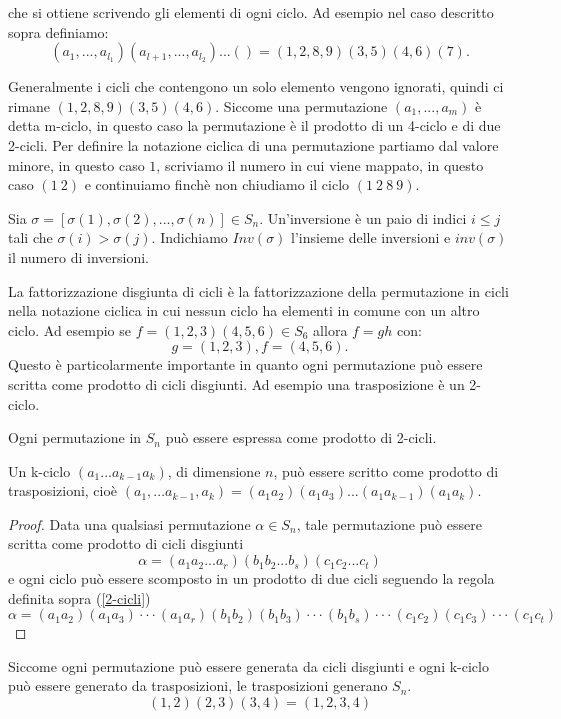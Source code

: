 che si ottiene scrivendo gli elementi di ogni ciclo. 
Ad esempio nel caso descritto sopra definiamo: 
$$
(a_1,...,a_{l_1})(a_{l+1},...,a_{l_2})...() = (1,2,8,9)(3,5)(4,6)(7).
$$

Generalmente i cicli che contengono un solo elemento vengono ignorati, quindi ci rimane $(1,2,8,9)(3,5)(4,6)$.
Siccome una permutazione $(a_1,...,a_m)$ è detta m-ciclo, in questo caso la permutazione è il prodotto di un 4-ciclo e di due 2-cicli. 
Per definire la notazione ciclica di una permutazione partiamo dal valore minore, in questo caso $1$, scriviamo il numero in cui viene mappato, in questo caso $(1 \ 2)$ e continuiamo finchè non chiudiamo il ciclo $(1\ 2 \ 8\ 9)$.

Sia $\sigma=[\sigma(1), \sigma(2),...,\sigma(n)] \in S_n$. Un'inversione è un paio di indici $i\leq j$ tali che $\sigma(i)>\sigma(j)$. Indichiamo $Inv(\sigma)$ l'insieme delle inversioni e $inv(\sigma)$ il numero di inversioni. 

La fattorizzazione disgiunta di cicli è la fattorizzazione della permutazione in cicli nella notazione ciclica in cui nessun ciclo ha elementi in comune con un altro ciclo. 
Ad esempio se $f = (1,2,3)(4,5,6)\in S_6$ allora $f=gh$ con: 
$$
g=(1,2,3),f=(4,5,6).
$$
Questo è particolarmente importante in quanto ogni permutazione può essere scritta come prodotto di cicli disgiunti. Ad esempio una trasposizione è un 2-ciclo.

\begin{definition}
    Ogni permutazione in $S_n$ può essere espressa come prodotto di 2-cicli.
\label{2-cicli}
\end{definition}

Un k-ciclo $(a_1...a_{k-1}a_k)$, di dimensione $n$,  può essere scritto come prodotto di trasposizioni,  cioè $(a_1,...a_{k-1},a_{k}) = (a_1a_2)(a_1a_3)...(a_1a_{k-1})(a_1a_k)$.

\begin{proof}
    Data una qualsiasi permutazione $\alpha \in S_n$, tale permutazione può essere scritta come prodotto di cicli disgiunti $$\alpha = (a_1a_2...a_r)(b_1b_2...b_s)(c_1c_2...c_t)$$ e ogni ciclo può essere scomposto in un prodotto di due cicli seguendo la regola definita sopra (\ref{2-cicli}) $$\alpha = (a_1 a_2)(a_1 a_3)···(a_1 a_r)(b_1 b_2)(b_1 b_3)···(b_1 b_s)···(c_1 c_2)(c_1 c_3)···(c_1 c_t )$$
\end{proof}

Siccome ogni permutazione può essere generata da cicli disgiunti e ogni k-ciclo può essere generato da trasposizioni, le trasposizioni generano $S_n$. 
$$
(1,2)(2,3)(3,4) = (1,2,3,4)
$$

